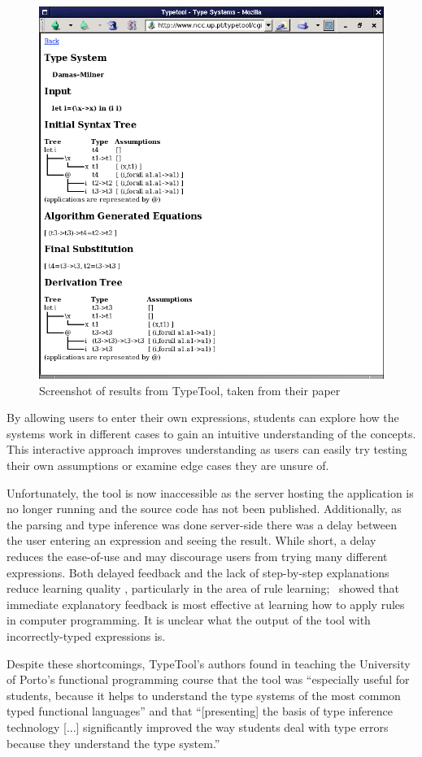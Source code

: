 \documentclass[a4paper,fleqn,12pt]{article}
\begin{document}
{\centering \begin{figure}[h!]
  \centering
  \includegraphics[width=0.770\linewidth]{images/image2.png}
  \caption{Screenshot of results from TypeTool, taken from their paper}
\end{figure} \par}

By allowing users to enter their own expressions, students can explore how the systems work in different cases to gain an intuitive understanding of the concepts. This interactive approach improves understanding as users can easily try testing their own assumptions or examine edge cases they are unsure of.

Unfortunately, the tool is now inaccessible as the server hosting the application is no longer running and the source code has not been published. Additionally, as the parsing and type inference was done server-side there was a delay between the user entering an expression and seeing the result. While short, a delay reduces the ease-of-use and may discourage users from trying many different expressions. Both delayed feedback and the lack of step-by-step explanations reduce learning quality \citep{ref5}, particularly in the area of rule learning;~\cite{ref6} showed that immediate explanatory feedback is most effective at learning how to apply rules in computer programming. It is unclear what the output of the tool with incorrectly-typed expressions is.

Despite these shortcomings, TypeTool’s authors found in teaching the University of Porto’s functional programming course that the tool was “especially useful for students, because it helps to understand the type systems of the most common typed functional languages” and that “[presenting] the basis of type inference technology [...] significantly improved the way students deal with type errors because they understand the type system.”
\end{document}
